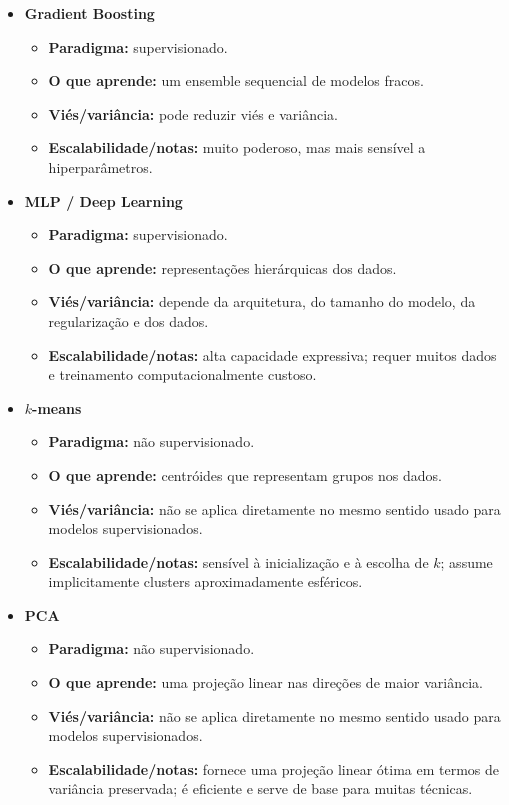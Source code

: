 \documentclass[12pt,a4paper]{article}
\begin{document}
\begin{itemize}
    \item \textbf{Gradient Boosting}
    \begin{itemize}
        \item \textbf{Paradigma:} supervisionado.
        \item \textbf{O que aprende:} um ensemble sequencial de modelos fracos.
        \item \textbf{Viés/variância:} pode reduzir viés e variância.
        \item \textbf{Escalabilidade/notas:} muito poderoso, mas mais sensível a hiperparâmetros.
    \end{itemize}

    \item \textbf{MLP / Deep Learning}
    \begin{itemize}
        \item \textbf{Paradigma:} supervisionado.
        \item \textbf{O que aprende:} representações hierárquicas dos dados.
        \item \textbf{Viés/variância:} depende da arquitetura, do tamanho do modelo, da regularização e dos dados.
        \item \textbf{Escalabilidade/notas:} alta capacidade expressiva; requer muitos dados e treinamento computacionalmente custoso.
    \end{itemize}

    \item \textbf{$k$-means}
    \begin{itemize}
        \item \textbf{Paradigma:} não supervisionado.
        \item \textbf{O que aprende:} centróides que representam grupos nos dados.
        \item \textbf{Viés/variância:} não se aplica diretamente no mesmo sentido usado para modelos supervisionados.
        \item \textbf{Escalabilidade/notas:} sensível à inicialização e à escolha de $k$; assume implicitamente clusters aproximadamente esféricos.
    \end{itemize}

    \item \textbf{PCA}
    \begin{itemize}
        \item \textbf{Paradigma:} não supervisionado.
        \item \textbf{O que aprende:} uma projeção linear nas direções de maior variância.
        \item \textbf{Viés/variância:} não se aplica diretamente no mesmo sentido usado para modelos supervisionados.
        \item \textbf{Escalabilidade/notas:} fornece uma projeção linear ótima em termos de variância preservada; é eficiente e serve de base para muitas técnicas.
    \end{itemize}
\end{itemize}
\end{document}
